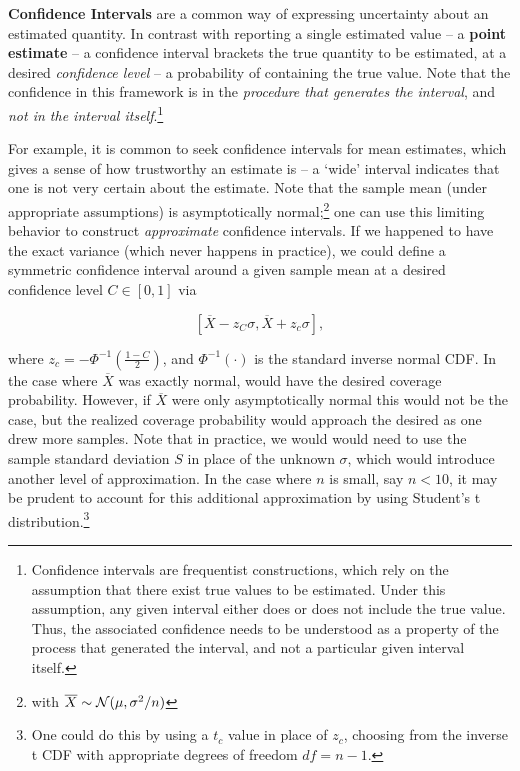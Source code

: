 \documentclass[../primer.tex]{subfiles}
\begin{document}
\textbf{Confidence Intervals} are a common way of expressing uncertainty about
an estimated quantity. In contrast with reporting a single estimated value -- a
\textbf{point estimate} -- a confidence interval brackets the true quantity to
be estimated, at a desired \emph{confidence level} -- a probability of
containing the true value. Note that the confidence in this framework is in the
\emph{procedure that generates the interval}, and \emph{not in the interval
  itself}.\footnote{Confidence intervals are frequentist constructions, which
  rely on the assumption that there exist true values to be estimated. Under
  this assumption, any given interval either does or does not include the true
  value. Thus, the associated confidence needs to be understood as a property of
  the process that generated the interval, and not a particular given interval
  itself.}

For example, it is common to seek confidence intervals for mean estimates, which
gives a sense of how trustworthy an estimate is -- a `wide' interval indicates
that one is not very certain about the estimate. Note that the sample mean
(under appropriate assumptions) is asymptotically normal;\footnote{with
  $\overline{X} \sim \mathcal{N}(\mu, \sigma^2/n)$} one can use this limiting behavior
to construct \emph{approximate} confidence intervals. If we happened to have the
exact variance (which never happens in practice), we could define a symmetric
confidence interval around a given sample mean at a desired confidence level
$C\in[0,1]$ via

\begin{equation} \label{eq:mean-ci}
  [\overline{X} - z_C \sigma, \overline{X} + z_c \sigma],
\end{equation}

\noindent where $z_c = - \Phi^{-1}(\frac{1-C}{2})$, and $\Phi^{-1}(\cdot)$ is
the standard inverse normal CDF. In the case where $\overline{X}$ was exactly
normal,  would have the desired coverage probability. However,
if $\overline{X}$ were only asymptotically normal this would not be the case,
but the realized coverage probability would approach the desired as one drew
more samples. Note that in practice, we would would need to use the sample
standard deviation $S$ in place of the unknown $\sigma$, which would introduce
another level of approximation. In the case where $n$ is small, say $n < 10$, it
may be prudent to account for this additional approximation by using Student's t
distribution.\footnote{One could do this by using a $t_c$ value in place of
  $z_c$, choosing from the inverse t CDF with appropriate degrees of freedom $df
  = n - 1$.}
\end{document}
